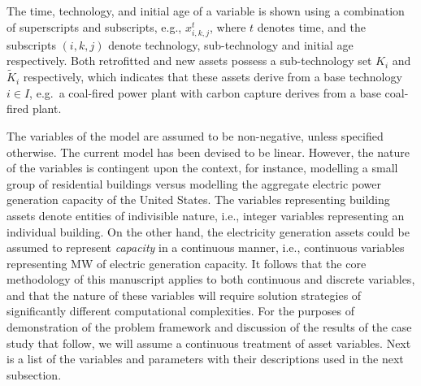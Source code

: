 \documentclass{amsart}
\begin{document}
The time, technology, and initial age of a variable is shown using a
combination of superscripts and subscripts, e.g., $x^t_{i,k,j}$, where $t$
denotes time, and the subscripts $(i,k,j)$ denote technology, sub-technology
and initial age respectively. Both retrofitted and new assets possess a
sub-technology set $K_i$ and $\tilde{K}_i$ respectively, which indicates that
these assets derive from a base technology $i\in I$, e.g.\ a coal-fired power
plant with carbon capture derives from a base coal-fired plant.

%
The variables of the model are assumed to be non-negative, unless specified
otherwise. The current model has been devised to be linear. However, the nature 
of the variables is contingent upon the context, for instance,  
modelling a small group of residential buildings versus modelling 
the aggregate electric power generation capacity of the United States. 
The variables representing building assets denote entities of indivisible 
nature, i.e., integer variables representing an individual building. 
On the other hand, the electricity generation assets could be assumed 
to represent \emph{capacity} in a continuous manner, i.e., continuous 
variables representing MW of electric generation capacity. It follows 
that the core methodology of this manuscript applies to both continuous 
and discrete variables, and that the nature of these variables will 
require solution strategies of significantly different computational 
complexities. For the purposes of demonstration of the problem framework 
and discussion of the results of the case study that follow, we will 
assume a continuous treatment of asset variables.
Next is a list of the variables and parameters with their descriptions
used in the next subsection.
\end{document}
